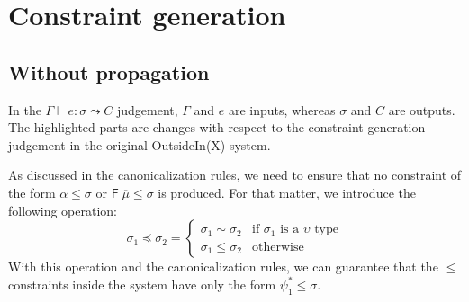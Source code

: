 \documentclass[12pt]{article}
\begin{document}
\section{Constraint generation}

\subsection{Without propagation}

In the $\Gamma \vdash e : \sigma \leadsto C$ judgement, $\Gamma$ and $e$ are inputs, whereas $\sigma$ and $C$ are outputs. The highlighted parts are changes with respect to the constraint generation judgement in the original {\sc OutsideIn(X)} system.

As discussed in the canonicalization rules, we need to ensure that no constraint of the form $\alpha \leq \sigma$ or $\mathsf{F} \; \overline{\mu} \leq \sigma$ is produced. For that matter, we introduce the following operation:
$$
\sigma_1 \preccurlyeq \sigma_2 =
\begin{cases}
\sigma_1 \sim \sigma_2 & \textrm{if } \sigma_1 \textrm{ is a } \upsilon \textrm{ type} \\
\sigma_1 \leq \sigma_2 & \textrm{otherwise}
\end{cases}
$$
With this operation and the canonicalization rules, we can guarantee that the $\leq$ constraints inside the system have only the form $\psi^*_1 \leq \sigma$.

\begin{prooftree}
\end{prooftree}

\begin{prooftree}
\end{prooftree}


\begin{prooftree}
\end{prooftree}
\end{document}
